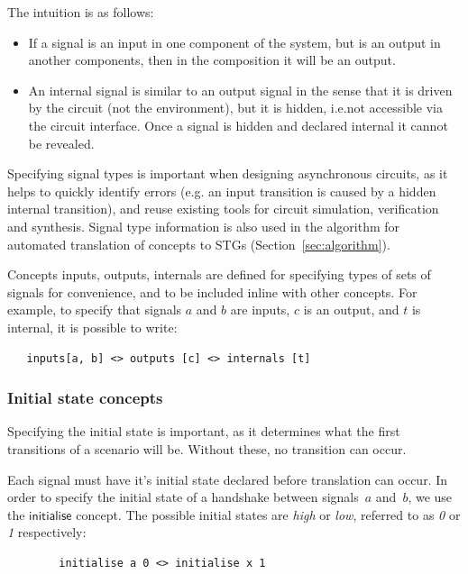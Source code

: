 \documentclass[british,conference,compsoc]{IEEEtran}
\begin{document}
The intuition is as follows:
\begin{itemize}
    \item If a signal is an input in one component of the system, but is an
    output in another components, then in the composition it will be an output.
    \item An internal signal is similar to an output signal in the sense
that it is driven by the circuit (not the environment), but it is hidden, 
i.e.not accessible via the circuit interface. Once a signal is hidden and 
declared internal it cannot be revealed.
\end{itemize}

\noindent Specifying signal types is important when designing asynchronous
circuits, as it helps to quickly identify errors (e.g. an input transition is
caused by a hidden internal transition), and reuse existing tools for circuit
simulation, verification and synthesis. Signal type information is also used
in the algorithm for automated translation of concepts to
STGs (Section~\ref{sec:algorithm}).

Concepts \textsf{inputs}, \textsf{outputs}, \textsf{internals} are defined for
specifying types of sets of signals for convenience, and to be included inline 
with other concepts. For example, to specify that signals $a$ and $b$ are 
inputs, $c$ is an output, and $t$ is internal, it is possible to write:

\begin{lstlisting}
   inputs[a, b] <> outputs [c] <> internals [t]
\end{lstlisting}

\subsubsection{Initial state concepts\label{sub:initState}}

Specifying the initial state is important, as it determines what the first 
transitions of a scenario will be. Without these, no transition can occur.

Each signal must have it's initial state declared before translation can occur. 
In order to specify the initial state of a handshake between signals~$a$
and~$b$, we use the $\mathsf{initialise}$ concept.
The possible initial states are \emph{high} or \emph{low}, referred to as 
\emph{0} or \emph{1} respectively:

\begin{lstlisting}
        initialise a 0 <> initialise x 1
\end{lstlisting}
\end{document}

